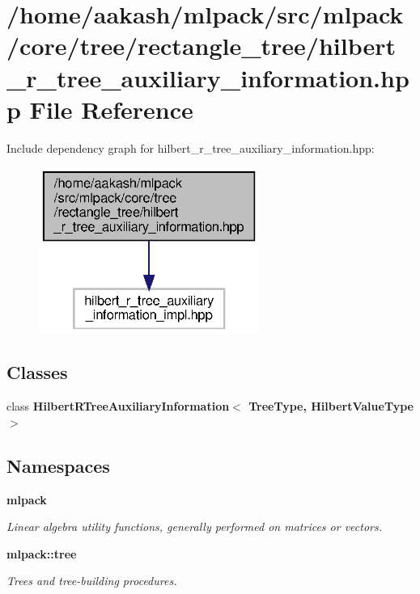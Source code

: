\section{/home/aakash/mlpack/src/mlpack/core/tree/rectangle\+\_\+tree/hilbert\+\_\+r\+\_\+tree\+\_\+auxiliary\+\_\+information.hpp File Reference}
\label{hilbert__r__tree__auxiliary__information_8hpp}
Include dependency graph for hilbert\+\_\+r\+\_\+tree\+\_\+auxiliary\+\_\+information.\+hpp\+:
\nopagebreak
\begin{figure}[H]
\begin{center}
\leavevmode
\includegraphics[width=204pt]{hilbert__r__tree__auxiliary__information_8hpp__incl}
\end{center}
\end{figure}
\subsection*{Classes}
\begin{DoxyCompactItemize}
\item 
class \textbf{ Hilbert\+R\+Tree\+Auxiliary\+Information$<$ Tree\+Type, Hilbert\+Value\+Type $>$}
\end{DoxyCompactItemize}
\subsection*{Namespaces}
\begin{DoxyCompactItemize}
\item 
 \textbf{ mlpack}
\begin{DoxyCompactList}\small\item\em Linear algebra utility functions, generally performed on matrices or vectors. \end{DoxyCompactList}\item 
 \textbf{ mlpack\+::tree}
\begin{DoxyCompactList}\small\item\em Trees and tree-\/building procedures. \end{DoxyCompactList}\end{DoxyCompactItemize}


